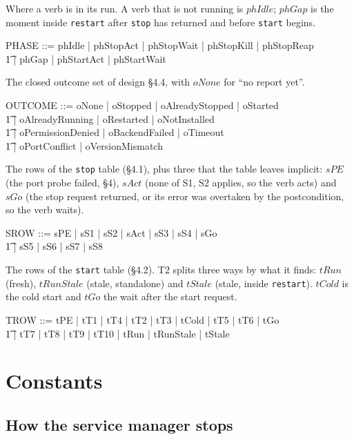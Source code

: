 \documentclass[a4paper,10pt,fleqn]{article}
\begin{document}
Where a verb is in its run. A verb that is not running is $phIdle$;
$phGap$ is the moment inside \texttt{restart} after \texttt{stop} has
returned and before \texttt{start} begins.

\begin{zed}
  PHASE ::= phIdle | phStopAct | phStopWait | phStopKill | phStopReap \\
  \t1 | phGap | phStartAct | phStartWait
\end{zed}

The closed outcome set of design \S4.4, with $oNone$ for ``no report yet''.

\begin{zed}
  OUTCOME ::= oNone | oStopped | oAlreadyStopped | oStarted \\
  \t1 | oAlreadyRunning | oRestarted | oNotInstalled \\
  \t1 | oPermissionDenied | oBackendFailed | oTimeout \\
  \t1 | oPortConflict | oVersionMismatch
\end{zed}

The rows of the \texttt{stop} table (\S4.1), plus three that the table leaves
implicit: $sPE$ (the port probe failed, \S4), $sAct$ (none of S1, S2 applies,
so the verb acts) and $sGo$ (the stop request returned, or its error was
overtaken by the postcondition, so the verb waits).

\begin{zed}
  SROW ::= sPE | sS1 | sS2 | sAct | sS3 | sS4 | sGo \\
  \t1 | sS5 | sS6 | sS7 | sS8
\end{zed}

The rows of the \texttt{start} table (\S4.2). T2 splits three ways by what it
finds: $tRun$ (fresh), $tRunStale$ (stale, standalone) and $tStale$ (stale,
inside \texttt{restart}). $tCold$ is the cold start and $tGo$ the wait after
the start request.

\begin{zed}
  TROW ::= tPE | tT1 | tT4 | tT2 | tT3 | tCold | tT5 | tT6 | tGo \\
  \t1 | tT7 | tT8 | tT9 | tT10 | tRun | tRunStale | tStale
\end{zed}

\section{Constants}

\subsection{How the service manager stops}
\end{document}
